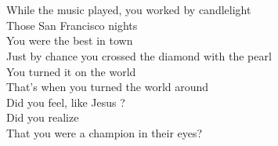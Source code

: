 \\ \\
While the music played, you worked by candlelight \\
Those San Francisco nights \\
You were the best in town \\
Just by chance you crossed the diamond with the pearl \\
You turned it on the world \\
That's when you turned the world around \\
Did you feel, like Jesus ?\\
Did you realize \\
That you were a champion in their eyes? \\
